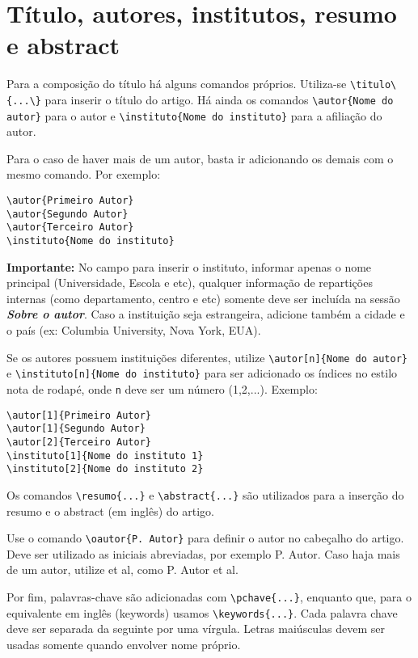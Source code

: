 \documentclass{article}
\begin{document}
\section{Título, autores, institutos, resumo e abstract}
Para a composição do título há alguns comandos próprios. Utiliza-se \verb|\titulo\{...\}| para inserir o título do artigo. Há ainda os comandos \verb|\autor{Nome do autor}| para o autor e \verb|\instituto{Nome do instituto}| para a afiliação do autor. 


Para o caso de haver mais de um autor, basta ir adicionando os demais com o mesmo comando. Por exemplo:
\begin{verbatim}
\autor{Primeiro Autor}
\autor{Segundo Autor}
\autor{Terceiro Autor}
\instituto{Nome do instituto}
\end{verbatim}
\textbf{Importante:} No campo para inserir o instituto, informar apenas o nome principal (Universidade, Escola e etc), qualquer informação de repartições internas (como departamento, centro e etc) somente deve ser incluída na sessão \textbf{\textit{Sobre o autor}}. Caso a instituição seja estrangeira, adicione também a cidade e o país (ex: Columbia University, Nova York, EUA).
	
Se os autores possuem instituições diferentes, utilize \verb|\autor[n]{Nome do autor}| e \verb|\instituto[n]{Nome do instituto}| para ser adicionado os índices no estilo nota de rodapé, onde \verb|n| deve ser um número (1,2,...). Exemplo:
\begin{verbatim}
\autor[1]{Primeiro Autor}
\autor[1]{Segundo Autor}
\autor[2]{Terceiro Autor}
\instituto[1]{Nome do instituto 1}
\instituto[2]{Nome do instituto 2}
\end{verbatim}
	
Os comandos \verb|\resumo{...}| e \verb|\abstract{...}| são utilizados para a inserção do resumo e o abstract (em inglês) do artigo.

Use o comando \verb|\oautor{P. Autor}| para definir o autor no cabeçalho do artigo. Deve ser utilizado as iniciais abreviadas, por exemplo P. Autor. Caso haja mais de um autor, utilize et al, como P. Autor et al.

Por fim, palavras-chave são adicionadas com \verb|\pchave{...}|, enquanto que, para o equivalente em inglês (keywords) usamos \verb|\keywords{...}|. Cada palavra chave deve ser separada da seguinte por uma vírgula. Letras maiúsculas devem ser usadas somente quando envolver nome próprio.
\end{document}
